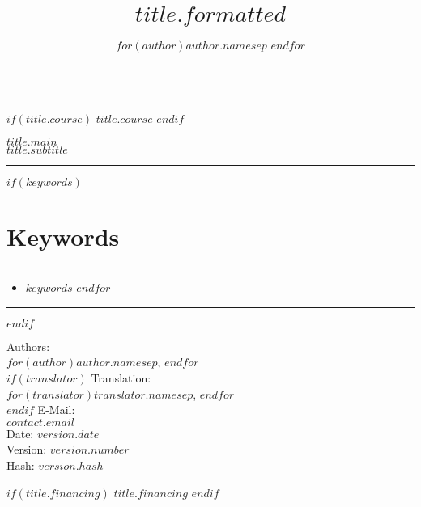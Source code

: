 \documentclass[12pt,a4paper, twoside=false]{scrartcl}
\author{
$for(author)$$author.name$$sep$ \And $endfor$
}
\title{$title.formatted$}
\providecommand{\Keywords}{%
\section*{Keywords}%
\begin{minipage}{\textwidth}%
\hrule%
\begin{multicols}{3}%
\begin{itemize}[leftmargin=0mm]%
$for(keywords)$\item[] $keywords$ $endfor$
\end{itemize}%
\end{multicols}%
\vspace{-2mm}%
\hrule%
\end{minipage}%
\needspace{.25\textheight}%
}
\begin{document}
\begin{titlepage}

\par
{}%
\hfill
{}%
\par

\begin{center}

\noindent\rule{\textwidth}{0.4pt}


$if(title.course)$
\vspace{0.5 cm} {\large \textsf{$title.course$}}
$endif$


\vspace{0.5 cm} {\LARGE \textbf{ \textsf{$title.main$}}}\\
\vspace{0.5 cm} {\Large \textsf{$title.subtitle$}}


\noindent\rule{\textwidth}{0.4pt}
\setcounter{tocdepth}{3}
\tableofcontents


$if(keywords)$
\Keywords
$endif$

\end{center}


 \begin{center}
  	\vspace{1 cm}Authors: \\ \vspace{2 mm}$for(author)$$author.name$$sep$, $endfor$ \\
$if(translator)$
  	\vspace{0.5 cm}Translation: \\ \vspace{2 mm}$for(translator)$$translator.name$$sep$, $endfor$ \\
$endif$
  	\vspace{0.5cm}E-Mail: \\ \vspace{2 mm} $contact.email$ \\
   	\vspace{0.5 cm}Date: $version.date$ \\
   	\vspace{2 mm}Version: $version.number$\\
   	\vspace{2 mm}Hash: $version.hash$

$if(title.financing)$
	\vspace{0.5 cm}  $title.financing$
$endif$


\end{center}
\end{titlepage}
\end{document}
